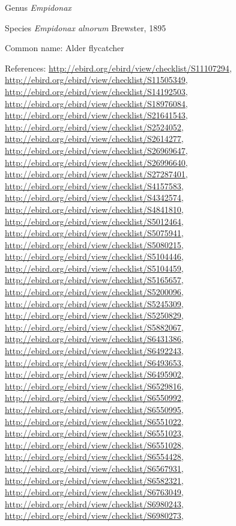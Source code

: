 \documentclass[9pt, article]{memoir}
\begin{document}
\begin{multicols}{2}
\vspace{6pt}\noindent\hspace{30pt}Genus \textit{Empidonax}


\vspace{6pt}\noindent\hspace{36pt}Species \textit{Empidonax alnorum} Brewster, 1895


Common name: Alder flycatcher

References: 
\url{http://ebird.org/ebird/view/checklist/S11107294}, 
\url{http://ebird.org/ebird/view/checklist/S11505349}, 
\url{http://ebird.org/ebird/view/checklist/S14192503}, 
\url{http://ebird.org/ebird/view/checklist/S18976084}, 
\url{http://ebird.org/ebird/view/checklist/S21641543}, 
\url{http://ebird.org/ebird/view/checklist/S2524052}, 
\url{http://ebird.org/ebird/view/checklist/S2614277}, 
\url{http://ebird.org/ebird/view/checklist/S26969647}, 
\url{http://ebird.org/ebird/view/checklist/S26996640}, 
\url{http://ebird.org/ebird/view/checklist/S27287401}, 
\url{http://ebird.org/ebird/view/checklist/S4157583}, 
\url{http://ebird.org/ebird/view/checklist/S4342574}, 
\url{http://ebird.org/ebird/view/checklist/S4841810}, 
\url{http://ebird.org/ebird/view/checklist/S5012464}, 
\url{http://ebird.org/ebird/view/checklist/S5075941}, 
\url{http://ebird.org/ebird/view/checklist/S5080215}, 
\url{http://ebird.org/ebird/view/checklist/S5104446}, 
\url{http://ebird.org/ebird/view/checklist/S5104459}, 
\url{http://ebird.org/ebird/view/checklist/S5165657}, 
\url{http://ebird.org/ebird/view/checklist/S5200096}, 
\url{http://ebird.org/ebird/view/checklist/S5245309}, 
\url{http://ebird.org/ebird/view/checklist/S5250829}, 
\url{http://ebird.org/ebird/view/checklist/S5882067}, 
\url{http://ebird.org/ebird/view/checklist/S6431386}, 
\url{http://ebird.org/ebird/view/checklist/S6492243}, 
\url{http://ebird.org/ebird/view/checklist/S6493653}, 
\url{http://ebird.org/ebird/view/checklist/S6495902}, 
\url{http://ebird.org/ebird/view/checklist/S6529816}, 
\url{http://ebird.org/ebird/view/checklist/S6550992}, 
\url{http://ebird.org/ebird/view/checklist/S6550995}, 
\url{http://ebird.org/ebird/view/checklist/S6551022}, 
\url{http://ebird.org/ebird/view/checklist/S6551023}, 
\url{http://ebird.org/ebird/view/checklist/S6551028}, 
\url{http://ebird.org/ebird/view/checklist/S6554428}, 
\url{http://ebird.org/ebird/view/checklist/S6567931}, 
\url{http://ebird.org/ebird/view/checklist/S6582321}, 
\url{http://ebird.org/ebird/view/checklist/S6763049}, 
\url{http://ebird.org/ebird/view/checklist/S6980243}, 
\url{http://ebird.org/ebird/view/checklist/S6980273}, 

\end{multicols}
\end{document}
